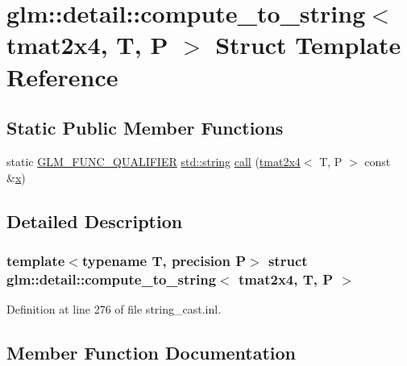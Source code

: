 \hypertarget{structglm_1_1detail_1_1compute__to__string_3_01tmat2x4_00_01_t_00_01_p_01_4}{}\section{glm\+::detail\+::compute\+\_\+to\+\_\+string$<$ tmat2x4, T, P $>$ Struct Template Reference}
\label{structglm_1_1detail_1_1compute__to__string_3_01tmat2x4_00_01_t_00_01_p_01_4}
\subsection*{Static Public Member Functions}
\begin{DoxyCompactItemize}
\item 
static \mbox{\hyperlink{setup_8hpp_a33fdea6f91c5f834105f7415e2a64407}{G\+L\+M\+\_\+\+F\+U\+N\+C\+\_\+\+Q\+U\+A\+L\+I\+F\+I\+ER}} \mbox{\hyperlink{glad_8h_ac83513893df92266f79a515488701770}{std\+::string}} \mbox{\hyperlink{structglm_1_1detail_1_1compute__to__string_3_01tmat2x4_00_01_t_00_01_p_01_4_a4db0bd22adda3c7b7cb7e697aefe0a76}{call}} (\mbox{\hyperlink{structglm_1_1tmat2x4}{tmat2x4}}$<$ T, P $>$ const \&\mbox{\hyperlink{glad_8h_a92d0386e5c19fb81ea88c9f99644ab1d}{x}})
\end{DoxyCompactItemize}


\subsection{Detailed Description}
\subsubsection*{template$<$typename T, precision P$>$\newline
struct glm\+::detail\+::compute\+\_\+to\+\_\+string$<$ tmat2x4, T, P $>$}



Definition at line 276 of file string\+\_\+cast.\+inl.



\subsection{Member Function Documentation}
\mbox{\label{structglm_1_1detail_1_1compute__to__string_3_01tmat2x4_00_01_t_00_01_p_01_4_a4db0bd22adda3c7b7cb7e697aefe0a76}} 
